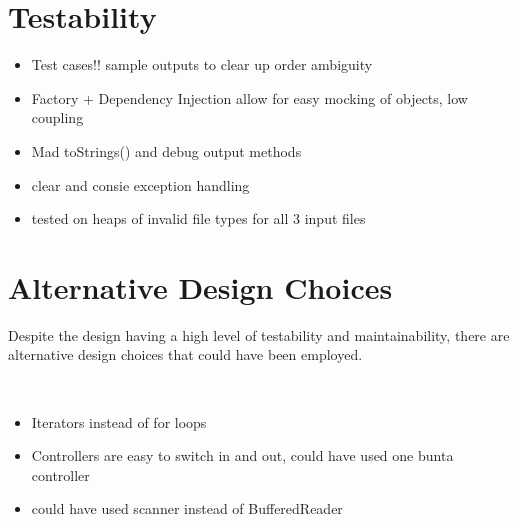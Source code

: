 \documentclass[]{article}
\begin{document}

\section*{Testability}

\begin{itemize}
	\item Test cases!! sample outputs to clear up order ambiguity
	\item Factory  + Dependency Injection allow for easy mocking of objects, low coupling
	\item Mad toStrings() and debug output methods
	\item clear and consie exception handling
	\item tested on heaps of invalid file types for all 3 input files
\end{itemize}


\section*{Alternative Design Choices}

Despite the design having a high level of testability and maintainability, there are alternative design choices that could have been employed.

\
\begin{itemize}
	\item Iterators instead of for loops
	\item Controllers are easy to switch in and out, could have used one bunta controller
	\item could have used scanner instead of BufferedReader
\end{itemize}

\end{document}
